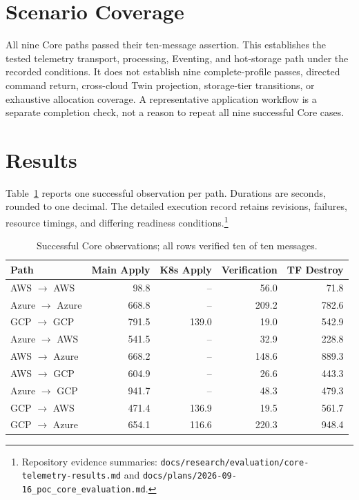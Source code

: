 \section{Scenario Coverage}
\label{sec:eval-scenarios}
All nine Core paths passed their ten-message assertion. This establishes the
tested telemetry transport, processing, Eventing, and hot-storage path under
the recorded conditions. It does not establish nine complete-profile passes,
directed command return, cross-cloud Twin projection, storage-tier transitions,
or exhaustive allocation coverage. A representative application workflow is a
separate completion check, not a reason to repeat all nine successful Core cases.

\section{Results}
\label{sec:eval-results}
Table~\ref{tab:core-observations} reports one successful observation per path.
Durations are seconds, rounded to one decimal. The detailed execution record
retains revisions, failures, resource timings, and differing readiness
conditions.\footnote{Repository evidence summaries:
\texttt{docs/research/evaluation/core-telemetry-results.md} and
\texttt{docs/plans/2026-09-16\_poc\_core\_evaluation.md}.}

\begin{table}[htbp]
\centering
\small
\caption{Successful Core observations; all rows verified ten of ten messages.}
\label{tab:core-observations}
\begin{tabular}{@{}lrrrr@{}}
\toprule
Path & Main Apply & K8s Apply & Verification & TF Destroy \\
\midrule
AWS $\rightarrow$ AWS & 98.8 & -- & 56.0 & 71.8 \\
Azure $\rightarrow$ Azure & 668.8 & -- & 209.2 & 782.6 \\
GCP $\rightarrow$ GCP & 791.5 & 139.0 & 19.0 & 542.9 \\
Azure $\rightarrow$ AWS & 541.5 & -- & 32.9 & 228.8 \\
AWS $\rightarrow$ Azure & 668.2 & -- & 148.6 & 889.3 \\
AWS $\rightarrow$ GCP & 604.9 & -- & 26.6 & 443.3 \\
Azure $\rightarrow$ GCP & 941.7 & -- & 48.3 & 479.3 \\
GCP $\rightarrow$ AWS & 471.4 & 136.9 & 19.5 & 561.7 \\
GCP $\rightarrow$ Azure & 654.1 & 116.6 & 220.3 & 948.4 \\
\bottomrule
\end{tabular}
\end{table}

